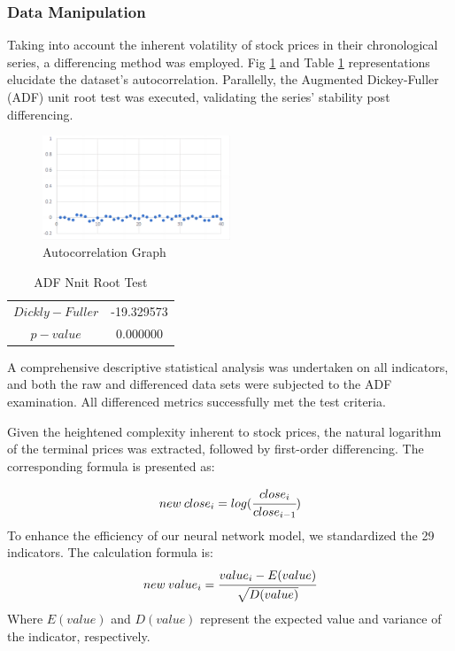 \documentclass[sn-mathphys,Numbered]{sn-jnl}
\theoremstyle{thmstyleone}%
\theoremstyle{thmstyletwo}%
\theoremstyle{thmstylethree}%
\begin{document}
\subsubsection{Data Manipulation}\label{subsubsec2}

Taking into account the inherent volatility of stock prices in their chronological series, a differencing method was employed. Fig \ref{adf} and Table \ref{tab_2} representations elucidate the dataset's autocorrelation. Parallelly, the Augmented Dickey-Fuller (ADF) unit root test was executed, validating the series' stability post differencing.
\begin{figure}[h]
    \centering
    \includegraphics[width=0.5\textwidth]{pngs/adf.png}
    \caption{ Autocorrelation Graph}
    \label{adf}
\end{figure}

\begin{table}[h]
\centering
\caption{ADF Nnit Root Test}\label{tab_2}%
\begin{tabular}{@{}cc@{}}
\toprule
$Dickly-Fuller$ & -19.329573 \\
$p-value$ & 0.000000 \\
\bottomrule
\end{tabular}
\end{table}


A comprehensive descriptive statistical analysis was undertaken on all indicators, and both the raw and differenced data sets were subjected to the ADF examination. All differenced metrics successfully met the test criteria.

Given the heightened complexity inherent to stock prices, the natural logarithm of the terminal prices was extracted, followed by first-order differencing. The corresponding formula is presented as:

\begin{align}
new\: close_i=log(\cfrac{close_i}{close_{i-1}})
\end{align}
To enhance the efficiency of our neural network model, we standardized the 29 indicators. The calculation formula is:
\begin{align}
new\: value_i=\cfrac{value_i-E(value)}{\sqrt{D(value)}}
\end{align}
Where \( E(value) \) and \( D(value) \) represent the expected value and variance of the indicator, respectively.
\end{document}
